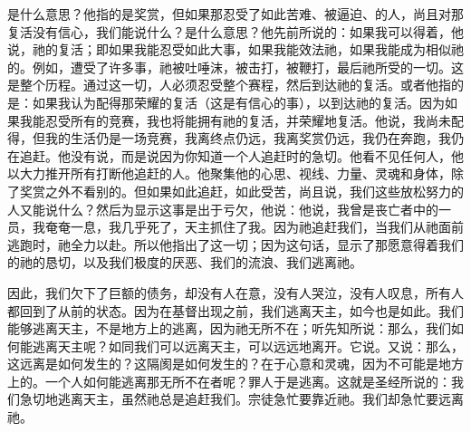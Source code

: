 是什么意思？他指的是奖赏，但如果那忍受了如此苦难、被逼迫、的人，尚且对那复活没有信心，我们能说什么？是什么意思？他先前所说的：如果我可以得着，他说，祂的复活；即如果我能忍受如此大事，如果我能效法祂，如果我能成为相似祂的。例如，遭受了许多事，祂被吐唾沫，被击打，被鞭打，最后祂所受的一切。这是整个历程。通过这一切，人必须忍受整个赛程，然后到达祂的复活。或者他指的是：如果我认为配得那荣耀的复活（这是有信心的事），以到达祂的复活。因为如果我能忍受所有的竞赛，我也将能拥有祂的复活，并荣耀地复活。他说，我尚未配得，但我的生活仍是一场竞赛，我离终点仍远，我离奖赏仍远，我仍在奔跑，我仍在追赶。他没有说，而是说因为你知道一个人追赶时的急切。他看不见任何人，他以大力推开所有打断他追赶的人。他聚集他的心思、视线、力量、灵魂和身体，除了奖赏之外不看别的。但如果如此追赶，如此受苦，尚且说，我们这些放松努力的人又能说什么？然后为显示这事是出于亏欠，他说：他说，我曾是丧亡者中的一员，我奄奄一息，我几乎死了，天主抓住了我。因为祂追赶我们，当我们从祂面前逃跑时，祂全力以赴。所以他指出了这一切；因为这句话，显示了那愿意得着我们的祂的恳切，以及我们极度的厌恶、我们的流浪、我们逃离祂。\par

因此，我们欠下了巨额的债务，却没有人在意，没有人哭泣，没有人叹息，所有人都回到了从前的状态。因为在基督出现之前，我们逃离天主，如今也是如此。我们能够逃离天主，不是地方上的逃离，因为祂无所不在；听先知所说：那么，我们如何能逃离天主呢？如同我们可以远离天主，可以远远地离开。它说。又说：那么，这远离是如何发生的？这隔阂是如何发生的？在于心意和灵魂，因为不可能是地方上的。一个人如何能逃离那无所不在者呢？罪人于是逃离。这就是圣经所说的：我们急切地逃离天主，虽然祂总是追赶我们。宗徒急忙要靠近祂。我们却急忙要远离祂。\par

